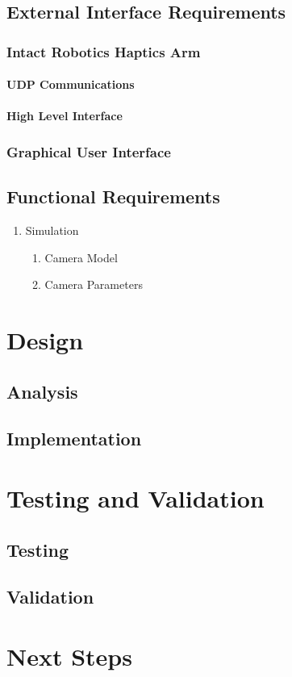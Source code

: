 \documentclass[11pt]{report}
\begin{document}
\section{External Interface Requirements}

\subsection{Intact Robotics Haptics Arm}

\subsubsection{UDP Communications}

\subsubsection{High Level Interface}

\subsection{Graphical User Interface}


\section{Functional Requirements}

\begin{enumerate}
\item Simulation
\begin{enumerate}
	\item Camera Model
	\item Camera Parameters 
\end{enumerate}
\end{enumerate}

\chapter{Design}

\section{Analysis}

\section{Implementation}

\chapter{Testing and Validation}

\section{Testing}

\section{Validation}

\chapter{Next Steps}

\printglossaries

{}
\end{document}

